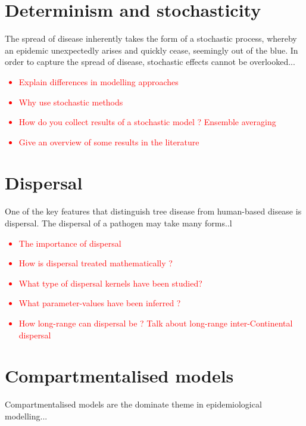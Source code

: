 \section{Determinism and stochasticity}

The spread of disease inherently takes the form of a stochastic process, whereby an epidemic unexpectedly arises and quickly cease, seemingly out of the blue. In order to capture the spread of disease, stochastic effects cannot be overlooked... 

\textcolor{red}{
\begin{itemize}
    \item Explain differences in modelling approaches
    \item Why use stochastic methods
    \item How do you collect results of a stochastic model ? Ensemble averaging
    \item Give an overview of some results in the literature
\end{itemize}}


\section{Dispersal}

One of the key features that distinguish tree disease from human-based disease is dispersal. The dispersal of a pathogen may take many forms..l
\textcolor{red}{
\begin{itemize}
    \item The importance of dispersal
    \item How is dispersal treated mathematically ?
    \item What type of dispersal kernels have been studied?
    \item What parameter-values have been inferred ?
    \item How long-range can dispersal be ? Talk about long-range inter-Continental dispersal
\end{itemize}}

\section{Compartmentalised models}
\label{ch2:lit-rev-compartmentalised-models}
Compartmentalised models are the dominate theme in epidemiological modelling...

\cite{segarra2001epidemic}

